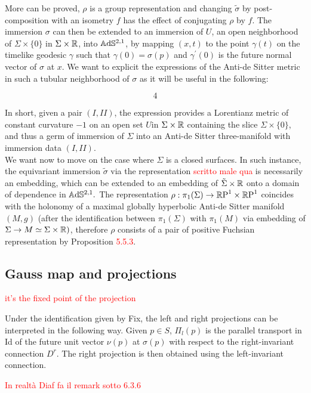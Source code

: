 More can be proved, $\rho$ is a group representation and changing $\tilde{\sigma}$ by post-composition with an isometry $f$ has the effect of conjugating $\rho$ by $f$. The immersion $\sigma$ can then be extended to an immersion of $U$, an open neighborhood of $\Sigma\times\{0\}$ in $\Sigma\times\mathbb{R}$, into $\mathbb{A}\mathrm{d}\mathbb{S}^{2,1}$, by mapping $(x,t)$ to the point $\gamma(t)$ on the timelike geodesic $\gamma$ such that $\gamma(0)=\sigma(p)$ and $\gamma^{\prime}(0)$ is the future normal vector of $\sigma$ at $x$. We want to explicit the expressions of the Anti-de Sitter metric in such a tubular neighborhood of $\sigma$ as it will be useful in the following: 

\begin{lemma}
    

\begin{equation}\label{64}
    4
\end{equation}


\end{lemma}

In short, given a pair $(I,II)$, the expression  provides a Lorentianz metric of constant curvature $-1$ on an open set $U$in $\Sigma\times\mathbb{R}$ containing the slice $\Sigma\times\{0\}$, and thus a germ of immersion of $\Sigma$ into an Anti-de Sitter three-manifold with immersion data $(I,II)$.\\
We want now to move on the case where $\Sigma$ is a closed surfaces. In such instance, the equivariant immersion $\tilde{\sigma}$ via the representation \textcolor{red}{scritto male qua} is necessarily an embedding, which can be extended to an embedding of $\tilde{\Sigma}\times\mathbb{R}$ onto a domain of dependence in $\mathbb{A}\mathrm{d}\mathbb{S}^{2,1}.$
The representation $\rho:\pi_1(\Sigma)\to\mathbb{R}\text{P}^1\times\mathbb{R}\text{P}^1$ coincides with the holonomy of a maximal globally hyperbolic Anti-de Sitter manifold $(M,g)$ (after the identification between $\pi_1(\Sigma)$ with $\pi_1(M)$ via embedding of $\Sigma\to M\simeq\Sigma\times\mathbb{R})$, therefore $\rho$ consists of a pair of positive Fuchsian representation by Proposition \textcolor{red}{5.5.3}. \\ 

\subsection{Gauss map and projections}
\textcolor{red}{it's the fixed point of the projection}

\begin{observation}
    Under the identification given by Fix, the left and right projections can be interpreted in the following way. Given $p\in S$, $\Pi_l(p)$ is the parallel transport in Id of the future unit vector $\nu(p)$ at $\sigma(p)$ with respect to the right-invariant connection $D^r$. The right projection is then obtained using the left-invariant connection. 

    \textcolor{red}{In realtà Diaf fa il remark sotto 6.3.6}
\end{observation}

